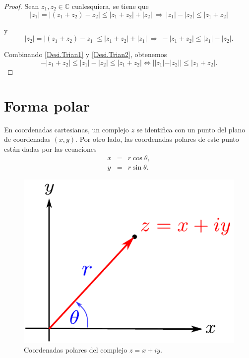 \begin{proof}
Sean $z_1, z_2 \in \mathbb{C}$ cualesquiera, se tiene que
\begin{equation}
|z_1| = |(z_1 + z_2) - z_2| \leq |z_1 + z_2| + |z_2| ~\Rightarrow~ |z_1| - |z_2| \leq |z_1 + z_2| \label{Desi.Trian1}
\end{equation}

y 
\begin{equation}
|z_2| = |(z_1 + z_2) - z_1| \leq |z_1 + z_2| + |z_1| ~\Rightarrow~ - |z_1 + z_2| \leq |z_1| - |z_2| \label{Desi.Trian2}.
\end{equation}

Combinando \eqref{Desi.Trian1} y \eqref{Desi.Trian2}, obtenemos
$$- |z_1 + z_2| \leq |z_1| - |z_2| \leq |z_1 + z_2| \Leftrightarrow ||z_1| - |z_2|| \leq |z_1 + z_2|.$$
\end{proof}

\section{Forma polar}

En coordenadas cartesianas, un complejo $z$ se identifica con un punto del plano de coordenadas $(x,y)$. Por otro lado, las coordenadas polares de este punto están dadas por las ecuaciones
\begin{eqnarray*}
x &=& r \cos \theta, \\
y &=& r \sin \theta .
\end{eqnarray*}

\begin{figure}[H]
    \centering
    \includegraphics[scale=0.6]{Figuras/Polar.pdf}
    \caption{Coordenadas polares del complejo $z = x +iy$.}
    \label{Polares}
\end{figure}

